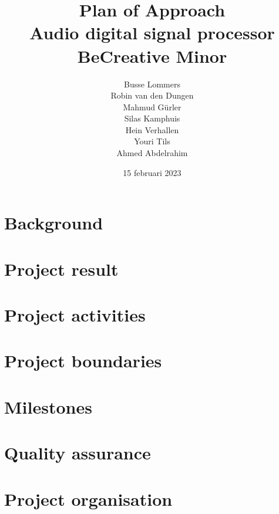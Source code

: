 \documentclass[11pt, a4paper]{report}
\begin{document}
\title{%
  Plan of Approach \\
  \large Audio digital signal processor \\
  BeCreative Minor}
\author{Busse Lommers \\
Robin van den Dungen \\
Mahmud Gürler \\
Silas Kamphuis \\
Hein Verhallen \\
Youri Tils \\
Ahmed Abdelrahim}
\date{15 februari 2023}
\maketitle
\tableofcontents

\chapter{Background}
	
	
\chapter{Project result}
	
	
\chapter{Project activities}
	

\chapter{Project boundaries}
	
	
\chapter{Milestones}
	

\chapter{Quality assurance}
	

\chapter{Project organisation}
	
\end{document}
